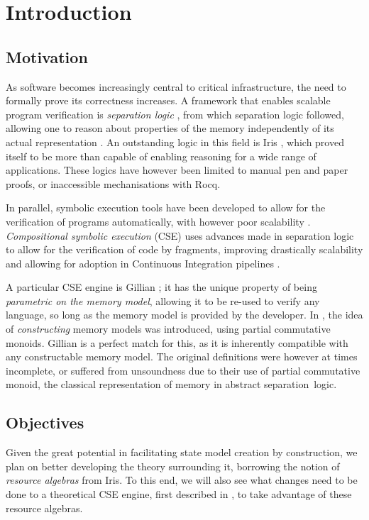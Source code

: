 \chapter{Introduction}

\section{Motivation}

As software becomes increasingly central to critical infrastructure, the need to formally prove its correctness increases. A framework that enables scalable program verification is \emph{separation logic} \cite{seplogic1,seplogic2}, from which  separation logic followed, allowing one to reason about properties of the memory independently of its actual representation \cite{higherorderseplogic,abstractseplogic}. An outstanding logic in this field is Iris \cite{iris}, which proved itself to be more than capable of enabling reasoning for a wide range of applications. These logics have however been limited to manual pen and paper proofs, or inaccessible mechanisations with Rocq.

In parallel, symbolic execution tools have been developed to allow for the verification of programs automatically, with however poor scalability \cite{pathexplo}. \emph{Compositional symbolic execution} (CSE) uses advances made in separation logic to allow for the verification of code by fragments, improving drastically scalability and allowing for adoption in Continuous Integration pipelines \cite{pulse}.

A particular CSE engine is Gillian \cite{gillian0}; it has the unique property of being \emph{parametric on the memory model}, allowing it to be re-used to verify any language, so long as the memory model is provided by the developer. In \cite{sacha-phd}, the idea of \emph{constructing} memory models was introduced, using partial commutative monoids. Gillian is a perfect match for this, as it is inherently compatible with any constructable memory model. The original definitions were however at times incomplete, or suffered from unsoundness due to their use of partial commutative monoid, the classical representation of memory in abstract separation~logic.

\section{Objectives}

Given the great potential in facilitating state model creation by construction, we plan on better developing the theory surrounding it, borrowing the notion of \emph{resource algebras} from Iris. To this end, we will also see what changes need to be done to a theoretical CSE engine, first described in \cite{cse1,cse2}, to take advantage of these resource algebras.

